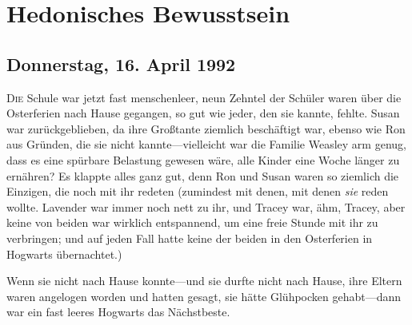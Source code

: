 \chapter{Hedonisches Bewusstsein}

\section{Donnerstag, 16. April 1992}

\lettrine{D}{ie} Schule war jetzt fast menschenleer, neun Zehntel der Schüler waren über die Osterferien nach Hause gegangen, so gut wie jeder, den sie kannte, fehlte. Susan war zurückgeblieben, da ihre Großtante ziemlich beschäftigt war, ebenso wie Ron aus Gründen, die sie nicht kannte—vielleicht war die Familie Weasley arm genug, dass es eine spürbare Belastung gewesen wäre, alle Kinder eine Woche länger zu ernähren?
Es klappte alles ganz gut, denn Ron und Susan waren so ziemlich die Einzigen, die noch mit ihr redeten (zumindest mit denen, mit denen \emph{sie} reden wollte. Lavender war immer noch nett zu ihr, und Tracey war, ähm, Tracey, aber keine von beiden war wirklich entspannend, um eine freie Stunde mit ihr zu verbringen; und auf jeden Fall hatte keine der beiden in den Osterferien in Hogwarts übernachtet.)

Wenn sie nicht nach Hause konnte—und sie durfte nicht nach Hause, ihre Eltern waren angelogen worden und hatten gesagt, sie hätte Glühpocken gehabt—dann war ein fast leeres Hogwarts das Nächstbeste.

